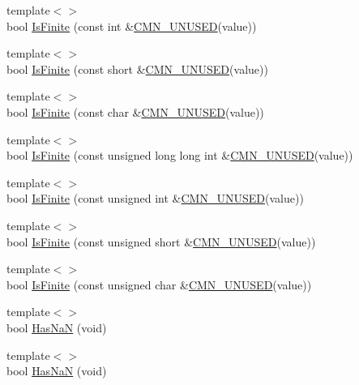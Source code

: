 \begin{DoxyCompactItemize}
\item 
{\footnotesize template$<$$>$ }\\bool \hyperlink{classcmn_type_traits_a4cbe90ed161de4147f49c29ec9d77fc8}{Is\-Finite} (const int \&\hyperlink{cmn_portability_8h_a021894e2626935fa2305434b1e893ff6}{C\-M\-N\-\_\-\-U\-N\-U\-S\-E\-D}(value))
\item 
{\footnotesize template$<$$>$ }\\bool \hyperlink{classcmn_type_traits_ac02e81d646ff4f4d98b72438c341ac2b}{Is\-Finite} (const short \&\hyperlink{cmn_portability_8h_a021894e2626935fa2305434b1e893ff6}{C\-M\-N\-\_\-\-U\-N\-U\-S\-E\-D}(value))
\item 
{\footnotesize template$<$$>$ }\\bool \hyperlink{classcmn_type_traits_ab4ef656affee9ec3bd76f0ba1dbaa782}{Is\-Finite} (const char \&\hyperlink{cmn_portability_8h_a021894e2626935fa2305434b1e893ff6}{C\-M\-N\-\_\-\-U\-N\-U\-S\-E\-D}(value))
\item 
{\footnotesize template$<$$>$ }\\bool \hyperlink{classcmn_type_traits_a36bead96d0a39112e7a69289600d13a8}{Is\-Finite} (const unsigned long long int \&\hyperlink{cmn_portability_8h_a021894e2626935fa2305434b1e893ff6}{C\-M\-N\-\_\-\-U\-N\-U\-S\-E\-D}(value))
\item 
{\footnotesize template$<$$>$ }\\bool \hyperlink{classcmn_type_traits_abc292d87bce717a48bc0e71bd063ccf6}{Is\-Finite} (const unsigned int \&\hyperlink{cmn_portability_8h_a021894e2626935fa2305434b1e893ff6}{C\-M\-N\-\_\-\-U\-N\-U\-S\-E\-D}(value))
\item 
{\footnotesize template$<$$>$ }\\bool \hyperlink{classcmn_type_traits_ae8cf98b7a2625a9e43eadf1dac12025e}{Is\-Finite} (const unsigned short \&\hyperlink{cmn_portability_8h_a021894e2626935fa2305434b1e893ff6}{C\-M\-N\-\_\-\-U\-N\-U\-S\-E\-D}(value))
\item 
{\footnotesize template$<$$>$ }\\bool \hyperlink{classcmn_type_traits_a27110c3f8bff3fd0de5f86f298888980}{Is\-Finite} (const unsigned char \&\hyperlink{cmn_portability_8h_a021894e2626935fa2305434b1e893ff6}{C\-M\-N\-\_\-\-U\-N\-U\-S\-E\-D}(value))
\item 
{\footnotesize template$<$$>$ }\\bool \hyperlink{classcmn_type_traits_a7531ba0e219c702284d3e0d8c5945fbb}{Has\-Na\-N} (void)
\item 
{\footnotesize template$<$$>$ }\\bool \hyperlink{classcmn_type_traits_a6ebf01b97b54732efbc870532a71b516}{Has\-Na\-N} (void)

\end{DoxyCompactItemize}
